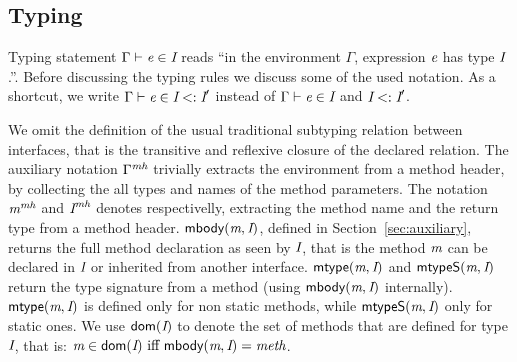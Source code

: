 \subsection{Typing}

Typing statement $\Gamma \vdash \textit{e}\in\textit{I}$ reads ``in the environment
$\Gamma$, expression $\textit{e}$ has type $\textit{I}$.''.
Before discussing the typing rules we discuss some of the used notation.
As a shortcut, we write
$\Gamma \vdash \textit{e}\in\textit{I}<:\textit{I}'$ instead of $\Gamma \vdash \textit{e}\in\textit{I}$ and
$\textit{I}<:\textit{I}'$.

We omit the definition of
the usual traditional subtyping relation between interfaces, that is the transitive and reflexive closure of the declared \Q@extends@ relation.
The auxiliary notation $\Gamma^\textit{mh}$ trivially
extracts the environment from a method header, by collecting the all types
and names of the method parameters.  The
notation $\textit{m}^\textit{mh}$ and $\textit{I}^\textit{mh}$ denotes respectivelly, extracting the
method name and the return type from a method header. $\textsf{mbody}(\textit{m},\textit{I})$,
defined in Section~\ref{sec:auxiliary},
returns the full method declaration as seen by $\textit{I}$, that is the
method $\textit{m}$ can be declared in $\textit{I}$ or inherited from another
interface.
$\textsf{mtype}(\textit{m},\textit{I})$ and $\textsf{mtypeS}(\textit{m},\textit{I})$ return the type
signature from a method (using $\textsf{mbody}(\textit{m},\textit{I})$ internally).
$\textsf{mtype}(\textit{m},\textit{I})$ is defined only for non static methods, while
$\textsf{mtypeS}(\textit{m},\textit{I})$ only for static ones. We use $\textsf{dom}(\textit{I})$ to
denote the set of methods that are defined for type $\textit{I}$, that is:
$\m\in\dom(\C)\ \miff \ \mBody(\m,\C)=\method$.

